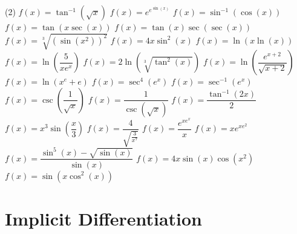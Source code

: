 \documentclass[12pt,]{book}
\theoremstyle{plain}
\theoremstyle{definition}
\numberwithin{equation}{section}
\newcommand{\fe}[2]{#1\mathopen{}\left(#2\right)\mathclose{}}
\begin{document}
\begin{exercisegroup}(2)
\exercise[16.]\hypertarget{exercise-497}{\null}\(\fe{f}{x}=\fe{\tan^{-1}}{\sqrt{x}}\)%
\exercise[17.]\hypertarget{exercise-498}{\null}\(\fe{f}{x}=e^{e^{\fe{\sin}{x}}}\)%
\exercise[18.]\hypertarget{exercise-499}{\null}\(\fe{f}{x}=\fe{\sin^{-1}}{\fe{\cos}{x}}\)%
\exercise[19.]\hypertarget{exercise-500}{\null}\(\fe{f}{x}=\fe{\tan}{x\fe{\sec}{x}}\)%
\exercise[20.]\hypertarget{exercise-501}{\null}\(\fe{f}{x}=\fe{\tan}{x}\fe{\sec}{\fe{\sec}{x}}\)%
\exercise[21.]\hypertarget{exercise-502}{\null}\(\fe{f}{x}=\sqrt[3]{\left(\fe{\sin}{x^2}\right)^2}\)%
\exercise[22.]\hypertarget{exercise-503}{\null}\(\fe{f}{x}=4x\fe{\sin^2}{x}\)%
\exercise[23.]\hypertarget{exercise-504}{\null}\(\fe{f}{x}=\fe{\ln}{x\fe{\ln}{x}}\)%
\exercise[24.]\hypertarget{exercise-505}{\null}\(\fe{f}{x}=\fe{\ln}{\dfrac{5}{xe^x}}\)%
\exercise[25.]\hypertarget{exercise-506}{\null}\(\fe{f}{x}=2\fe{\ln}{\sqrt[3]{\fe{\tan^2}{x}}}\)%
\exercise[26.]\hypertarget{exercise-507}{\null}\(\fe{f}{x}=\fe{\ln}{\dfrac{e^{x+2}}{\sqrt{x+2}}}\)%
\exercise[27.]\hypertarget{exercise-508}{\null}\(\fe{f}{x}=\fe{\ln}{x^e+e}\)%
\exercise[28.]\hypertarget{exercise-509}{\null}\(\fe{f}{x}=\fe{\sec^4}{e^x}\)%
\exercise[29.]\hypertarget{exercise-510}{\null}\(\fe{f}{x}=\fe{\sec^{-1}}{e^x}\)%
\exercise[30.]\hypertarget{exercise-511}{\null}\(\fe{f}{x}=\fe{\csc}{\dfrac{1}{\sqrt{x}}}\)%
\exercise[31.]\hypertarget{exercise-512}{\null}\(\fe{f}{x}=\dfrac{1}{\fe{\csc}{\sqrt{x}}}\)%
\exercise[32.]\hypertarget{exercise-513}{\null}\(\fe{f}{x}=\dfrac{\fe{\tan^{-1}}{2x}}{2}\)%
\exercise[33.]\hypertarget{exercise-514}{\null}\(\fe{f}{x}=x^3\fe{\sin}{\dfrac{x}{3}}\)%
\exercise[34.]\hypertarget{exercise-515}{\null}\(\fe{f}{x}=\dfrac{4}{\sqrt{\frac{3}{x^7}}}\)%
\exercise[35.]\hypertarget{exercise-516}{\null}\(\fe{f}{x}=\dfrac{e^{xe^x}}{x}\)%
\exercise[36.]\hypertarget{exercise-517}{\null}\(\fe{f}{x}=xe^{xe^2}\)%
\exercise[37.]\hypertarget{exercise-518}{\null}\(\fe{f}{x}=\dfrac{\fe{\sin^5}{x}-\sqrt{\fe{\sin}{x}}}{\fe{\sin}{x}}\)%
\exercise[38.]\hypertarget{exercise-519}{\null}\(\fe{f}{x}=4x\fe{\sin}{x}\fe{\cos}{x^2}\)%
\exercise[39.]\hypertarget{exercise-520}{\null}\(\fe{f}{x}=\fe{\sin}{x\fe{\cos^2}{x}}\)%
\end{exercisegroup}
\par\smallskip\noindent
\typeout{************************************************}
\typeout{************************************************}
\chapter[Implicit Differentiation]{Implicit Differentiation}\label{chapter-implicit-differentiation}
\typeout{************************************************}
\typeout{************************************************}
\end{document}
